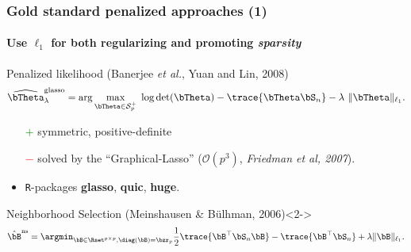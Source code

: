 \begin{frame}
  \frametitle{Gold standard penalized approaches (1)}
  \framesubtitle{Use $\ell_1$ for both regularizing and promoting \textit{sparsity}}

  \begin{overlayarea}{\textwidth}{\textheight}

    \begin{block}{Penalized   likelihood  (Banerjee   \textit{et
          al.}, Yuan and Lin, 2008)}
      \vspace{-1em}
\begin{equation*}
  \label{eq:MLE_l1}
  \widehat{\invcov}^{\text{glasso}}_\lambda = \arg \max_{\invcov \in \mathcal{S}^+_p} \; \log
  \det(\invcov) - \trace{\invcov \empcov} -
  \lambda\ \|\invcov\|_{\ell_1}.
\end{equation*}
    \end{block}
    \vspace*{-1.5em}
    
    \begin{itemize}
    \item[\textcolor{green}{$+$}] symmetric, positive-definite
    \item[\textcolor{red}{$-$}]       solved      by       the
      ``Graphical-Lasso''                 ($\mathcal{O}(p^3)$,
      \textit{Friedman et al, 2007}).
    \item \texttt{R}-packages \textbf{glasso}, \textbf{quic}, \textbf{huge}.
    \end{itemize}
    
    \vfill
    
    \begin{block}{Neighborhood    Selection   (Meinshausen    \&
        B\"ulhman, 2006)}<2-> \vspace*{-1em}
\begin{equation*}
  \label{eq:MB_pseudo}
  \hat\bB^{\text{ns}}  = \argmin_{\bB\in\Rset^{p\times  p}, \diag(\bB)
    =    \bzr_p}    \frac{1}{2}    \trace{\bB^\top\empcov    \bB}    -
  \trace{\bB^\top\empcov} + \lambda \|\bB\|_{\ell_1}.
\end{equation*}
      \vspace*{-1.5em}
    \end{block}
    
     
\end{overlayarea}      

\end{frame}

